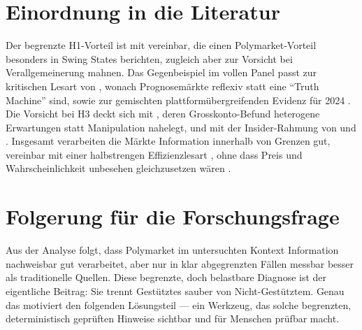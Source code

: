 \section{Einordnung in die Literatur}
Der begrenzte H1-Vorteil ist mit \citet{zotero_poly_002} vereinbar, die einen
Polymarket-Vorteil besonders in Swing States berichten, zugleich aber zur Vorsicht
bei Verallgemeinerung mahnen. Das Gegenbeispiel im vollen Panel passt zur kritischen
Lesart von \citet{zotero_poly_009}, wonach Prognosemärkte reflexiv statt eine
``Truth Machine'' sind, sowie zur gemischten plattformübergreifenden Evidenz für
2024 \citep{lit_poly24_accuracy}. Die Vorsicht bei H3 deckt sich mit
\citet{zotero_poly_001}, deren Grosskonto-Befund heterogene Erwartungen statt
Manipulation nahelegt, und mit der Insider-Rahmung von \citet{lit_kyle_001} und
\citet{zotero_delvecchio_001}. Insgesamt verarbeiten die Märkte Information
innerhalb von Grenzen gut, vereinbar mit einer halbstrengen Effizienzlesart
\citep{lit_emh_001}, ohne dass Preis und Wahrscheinlichkeit unbesehen
gleichzusetzen wären \citep{lit_manski_2006}.

\section{Folgerung für die Forschungsfrage}
Aus der Analyse folgt, dass Polymarket im untersuchten Kontext Information
nachweisbar gut verarbeitet, aber nur in klar abgegrenzten Fällen messbar besser
als traditionelle Quellen. Diese begrenzte, doch belastbare Diagnose ist der
eigentliche Beitrag: Sie trennt Gestütztes sauber von Nicht-Gestütztem. Genau das
motiviert den folgenden Lösungsteil --- ein Werkzeug, das solche begrenzten,
deterministisch geprüften Hinweise sichtbar und für Menschen prüfbar macht.
